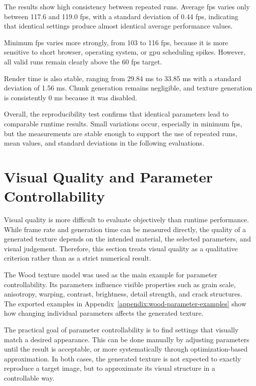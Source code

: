 The results show high consistency between repeated runs. Average \gls{fps} varies only between 117.6 and 119.0 \gls{fps}, with a standard deviation of 0.44 \gls{fps}, indicating that identical settings produce almost identical average performance values.

Minimum \gls{fps} varies more strongly, from 103 to 116 \gls{fps}, because it is more sensitive to short browser, operating system, or \gls{gpu} scheduling spikes. However, all valid runs remain clearly above the 60 \gls{fps} target.

Render time is also stable, ranging from 29.84 ms to 33.85 ms with a standard deviation of 1.56 ms. Chunk generation remains negligible, and texture generation is consistently 0 ms because it was disabled.

Overall, the reproducibility test confirms that identical parameters lead to comparable runtime results. Small variations occur, especially in minimum \gls{fps}, but the measurements are stable enough to support the use of repeated runs, mean values, and standard deviations in the following evaluations.

\section{Visual Quality and Parameter Controllability}

Visual quality is more difficult to evaluate objectively than runtime performance. While frame rate and generation time can be measured directly, the quality of a generated texture depends on the intended material, the selected parameters, and visual judgement. Therefore, this section treats visual quality as a qualitative criterion rather than as a strict numerical result.

The Wood texture model was used as the main example for parameter controllability. Its parameters influence visible properties such as grain scale, anisotropy, warping, contrast, brightness, detail strength, and crack structures. The exported examples in Appendix~\ref{appendix:wood-parameter-examples} show how changing individual parameters affects the generated texture.

The practical goal of parameter controllability is to find settings that visually match a desired appearance. This can be done manually by adjusting parameters until the result is acceptable, or more systematically through optimization-based approximation. In both cases, the generated texture is not expected to exactly reproduce a target image, but to approximate its visual structure in a controllable way.


